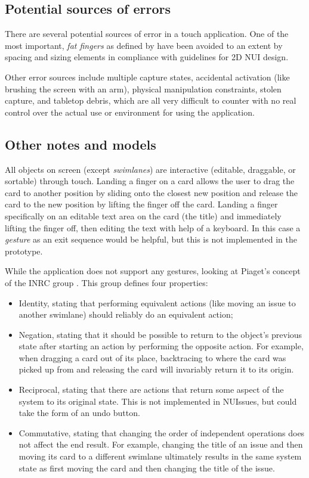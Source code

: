 \subsection{Potential sources of errors}

There are several potential sources of error in a touch application. One of the most important, \textit{fat fingers} as defined by \textcite[73]{wigdow-wixon:brave-nui-world:2011} have been avoided to an extent by spacing and sizing elements in compliance with guidelines for 2D NUI design.

Other error sources include multiple capture states, accidental activation (like brushing the screen with an arm), physical manipulation constraints, stolen capture, and tabletop debris, which are all very difficult to counter with no real control over the actual use or environment for using the application.

\subsection{Other notes and models}

All objects on screen (except \textit{swimlanes}) are interactive (editable, draggable, or sortable) through touch. Landing a finger on a card allows the user to drag the card to another position by sliding onto the closest new position and release the card to the new position by lifting the finger off the card. Landing a finger specifically on an editable text area on the card (the title) and immediately lifting the finger off, then editing the text with help of a keyboard. In this case a \textit{gesture} \parencite[157]{wigdow-wixon:brave-nui-world:2011} as an exit sequence would be helpful, but this is not implemented in the prototype.

While the application does not support any gestures, looking at Piaget's concept of the INRC group \parencite[137]{wigdow-wixon:brave-nui-world:2011}. This group defines four properties:

\begin{itemize}
  \item Identity, stating that performing equivalent actions (like moving an issue to another swimlane) should reliably do an equivalent action;
  \item Negation, stating that it should be possible to return to the object's previous state after starting an action by performing the opposite action. For example, when dragging a card out of its place, backtracing to where the card was picked up from and releasing the card will invariably return it to its origin.
  \item Reciprocal, stating that there are actions that return some aspect of the system to its original state. This is not implemented in NUIssues, but could take the form of an undo button.
  \item Commutative, stating that changing the order of independent operations does not affect the end result. For example, changing the title of an issue and then moving its card to a different swimlane ultimately results in the same system state as first moving the card and then changing the title of the issue.
\end{itemize}

